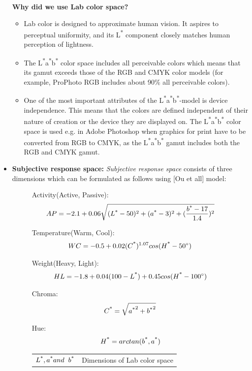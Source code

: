 \begin{itemize}
\textbf{Why did we use Lab color space? }\\
\begin{itemize} 
\item{Lab color is designed to approximate human vision. It aspires to perceptual uniformity, and its L\textsuperscript{*} component closely matches human perception of lightness.}
\item{The L\textsuperscript{*}a\textsuperscript{*}b\textsuperscript{*} color space includes all perceivable colors which means that its gamut exceeds those of the RGB and CMYK color models (for example, ProPhoto RGB includes about 90\% all perceivable colors).}
\item{One of the most important attributes of the L\textsuperscript{*}a\textsuperscript{*}b\textsuperscript{*}-model is device independence. This means that the colors are defined independent of their nature of creation or the device they are displayed on. The L\textsuperscript{*}a\textsuperscript{*}b\textsuperscript{*} color space is used e.g. in Adobe Photoshop when graphics for print have to be converted from RGB to CMYK, as the L\textsuperscript{*}a\textsuperscript{*}b\textsuperscript{*} gamut includes both the RGB and CMYK gamut.}
\end{itemize}

\item{\textbf{Subjective response space: }} \textit{Subjective response space} consists of three dimensions which can be formulated as follows using [Ou et all] model:


\begin{figure}[!htb]
Activity(Active, Passive):
\[ AP = -2.1+0.06\sqrt{(L\textsuperscript{*}-50)^{2} + (a\textsuperscript{*}-3)^{2} + (\frac{b\textsuperscript{*}-17}{1.4})^{2}} \]
\end{figure}


\begin{figure}[!htb]
Temperature(Warm, Cool):
\[ WC = -0.5+0.02(C\textsuperscript{*})^{1.07}cos(H\textsuperscript{*} - 50^{\circ} ) \]
\end{figure}  


\begin{figure}[!htb]
Weight(Heavy, Light):
\[ HL = -1.8+0.04(100-L\textsuperscript{*}) + 0.45cos(H\textsuperscript{*}-100^{\circ} ) \]
\end{figure}


\begin{figure}[!htb]
Chroma:
\[ C\textsuperscript{*} = \sqrt{a\textsuperscript{*}^2 + b\textsuperscript{*}^2}\]
\end{figure}


\begin{figure}[!htb]
\vspace{-3.5mm}
Hue:
\[ H\textsuperscript{*} = arctan(b\textsuperscript{*},a\textsuperscript{*}) \]
  \begin{tabular}{@{}>{$}l<{$}l@{}}
    L\textsuperscript{*}, a\textsuperscript{*} and  {\hspace{2mm}}  b\textsuperscript{*} & Dimensions of Lab color space\\
  \end{tabular}
\end{figure}
\end{itemize}


